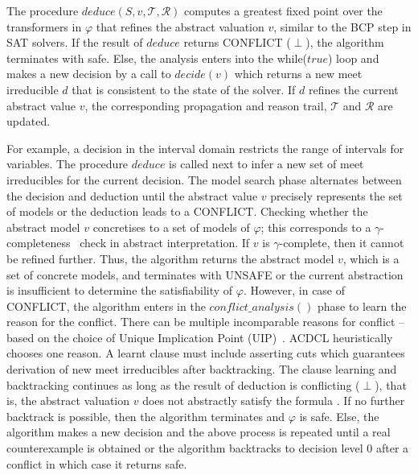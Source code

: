The procedure $deduce(S,v,\mathcal{T},\mathcal{R})$ computes a greatest 
fixed point over the transformers in $\varphi$ that refines the abstract valuation 
$v$, similar to the BCP step in SAT solvers.  If the result of $deduce$ 
returns \textsf{CONFLICT} ($\perp$), the algorithm terminates with \textsf{safe}. 
Else, the analysis enters into the while($true$) loop and makes a new decision 
by a call to $decide(v)$ which returns a new meet irreducible $d$ that is
consistent to the state of the solver.  If $d$ refines the current abstract 
value $v$, the corresponding propagation and reason trail, $\mathcal{T}$ 
and $\mathcal{R}$ are updated. 

For example, a decision in the interval domain restricts the range of 
intervals for variables.
The procedure $deduce$ is called next to infer a new 
set of meet irreducibles for the current decision.  The model search phase 
alternates between the decision and deduction until the abstract value $v$ 
precisely  represents the set of models or the deduction leads to a \textsf{CONFLICT}.  
Checking whether the abstract model $v$ concretises to a set of models of $\varphi$; this corresponds to a 
$\gamma$-completeness~\cite{dhk2013-popl} check in abstract interpretation.  
If $v$ is $\gamma$-complete, then it cannot be refined further.  Thus, the 
algorithm returns the abstract model $v$, which is a set of concrete models, and terminates with UNSAFE or the 
current abstraction is insufficient to determine the satisfiability of $\varphi$.  
However, in case of \textsf{CONFLICT}, the algorithm enters in the 
$conflict\_analysis()$ phase to learn the reason for the conflict.  
There can be multiple incomparable reasons for conflict -- based on 
the choice of Unique Implication Point (UIP)~\cite{cdcl}.  ACDCL heuristically 
chooses one reason.  A learnt clause must include asserting cuts which 
guarantees derivation of new meet irreducibles after backtracking. The clause 
learning and backtracking continues as long as the result of deduction 
is conflicting ($\perp$), that is, the abstract valuation $v$ does not
abstractly satisfy the formula .  If no further backtrack is possible, 
then the algorithm terminates and $\varphi$ is \textsf{safe}. Else, the 
algorithm makes a new decision and the above process is repeated 
until a real counterexample  is obtained or the algorithm backtracks to 
decision level 0 after a conflict in which case it returns \textsf{safe}. 

